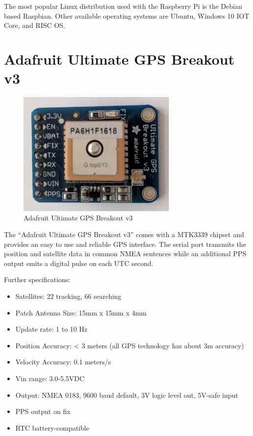 The most popular Linux distribution used with the Raspberry Pi is the Debian based Raspbian. Other available operating systems are Ubuntu, Windows 10 IOT Core, and RISC OS.

\section{Adafruit Ultimate GPS Breakout v3}

\begin{figure}[tb]
	\centering
	\includegraphics[width=0.7\textwidth]{figures/hw_gps.jpg}
	\caption{Adafruit Ultimate GPS Breakout v3}
	\label{fig:gps}
\end{figure}

The “Adafruit Ultimate GPS Breakout v3” comes with a MTK3339 chipset and provides an easy to use and reliable GPS interface. The serial port transmits the position and satellite data in common NMEA sentences while an additional PPS output emits a digital pulse on each UTC second.

Further specifications:
\begin{itemize}
\item Satellites: 22 tracking, 66 searching
\item Patch Antenna Size: 15mm x 15mm x 4mm
\item Update rate: 1 to 10 Hz
\item Position Accuracy: < 3 meters (all GPS technology has about 3m accuracy)
\item Velocity Accuracy: 0.1 meters/s
\item Vin range: 3.0-5.5VDC
\item Output: NMEA 0183, 9600 baud default, 3V logic level out, 5V-safe input
\item PPS output on fix
\item RTC battery-compatible
\end{itemize}

